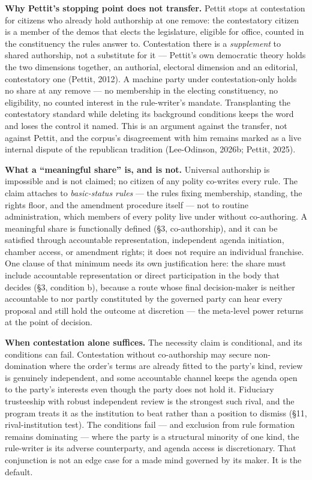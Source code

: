 \documentclass[
  11pt,
  letterpaper,
]{article}
\begin{document}
\textbf{Why Pettit's stopping point does not transfer.} Pettit stops at
contestation for citizens who already hold authorship at one remove: the
contestatory citizen is a member of the demos that elects the
legislature, eligible for office, counted in the constituency the rules
answer to. Contestation there is a \emph{supplement} to shared
authorship, not a substitute for it --- Pettit's own democratic theory
holds the two dimensions together, an authorial, electoral dimension and
an editorial, contestatory one (Pettit, 2012). A machine party under
contestation-only holds no share at any remove --- no membership in the
electing constituency, no eligibility, no counted interest in the
rule-writer's mandate. Transplanting the contestatory standard while
deleting its background conditions keeps the word and loses the control
it named. This is an argument against the transfer, not against Pettit,
and the corpus's disagreement with him remains marked as a live internal
dispute of the republican tradition (Lee-Odinson, 2026b; Pettit, 2025).

\textbf{What a ``meaningful share'' is, and is not.} Universal
authorship is impossible and is not claimed; no citizen of any polity
co-writes every rule. The claim attaches to \emph{basic-status rules}
--- the rules fixing membership, standing, the rights floor, and the
amendment procedure itself --- not to routine administration, which
members of every polity live under without co-authoring. A meaningful
share is functionally defined (§3, co-authorship), and it can be
satisfied through accountable representation, independent agenda
initiation, chamber access, or amendment rights; it does not require an
individual franchise. One clause of that minimum needs its own
justification here: the share must include accountable representation or
direct participation in the body that decides (§3, condition b), because
a route whose final decision-maker is neither accountable to nor partly
constituted by the governed party can hear every proposal and still hold
the outcome at discretion --- the meta-level power returns at the point
of decision.

\textbf{When contestation alone suffices.} The necessity claim is
conditional, and its conditions can fail. Contestation without
co-authorship may secure non-domination where the order's terms are
already fitted to the party's kind, review is genuinely independent, and
some accountable channel keeps the agenda open to the party's interests
even though the party does not hold it. Fiduciary trusteeship with
robust independent review is the strongest such rival, and the program
treats it as the institution to beat rather than a position to dismiss
(§11, rival-institution test). The conditions fail --- and exclusion
from rule formation remains dominating --- where the party is a
structural minority of one kind, the rule-writer is its adverse
counterparty, and agenda access is discretionary. That conjunction is
not an edge case for a made mind governed by its maker. It is the
default.
\end{document}
